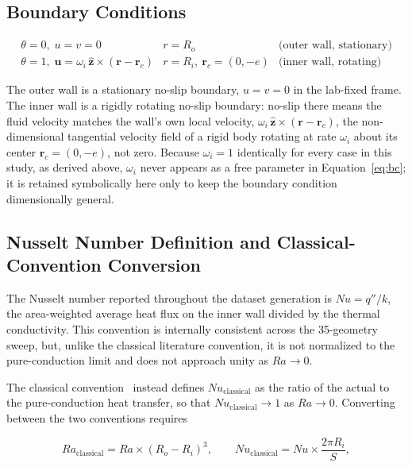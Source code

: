\subsection{Boundary Conditions}
\label{subsec:bc}

\begin{equation}
\begin{array}{lll}
  \theta = 0,\; u=v=0 & r = R_o & \text{(outer wall, stationary)} \\[4pt]
  \theta = 1,\; \mathbf{u} = \omega_i\,\hat{\mathbf{z}}\times(\mathbf{r}-\mathbf{r}_c) & r = R_i,\ \mathbf{r}_c=(0,-e) & \text{(inner wall, rotating)}
\end{array}
\label{eq:bc}
\end{equation}

The outer wall is a stationary no-slip boundary, $u=v=0$ in the lab-fixed frame. The inner wall is a rigidly rotating no-slip boundary: no-slip there means the fluid velocity matches the wall's own local velocity, $\omega_i\,\hat{\mathbf{z}}\times(\mathbf{r}-\mathbf{r}_c)$, the non-dimensional tangential velocity field of a rigid body rotating at rate $\omega_i$ about its center $\mathbf{r}_c=(0,-e)$, not zero. Because $\omega_i=1$ identically for every case in this study, as derived above, $\omega_i$ never appears as a free parameter in Equation~\eqref{eq:bc}; it is retained symbolically here only to keep the boundary condition dimensionally general.

\subsection{Nusselt Number Definition and Classical-Convention Conversion}
\label{subsec:nu_convention}

The Nusselt number reported throughout the dataset generation is $Nu = q''/k$, the area-weighted average heat flux on the inner wall divided by the thermal conductivity. This convention is internally consistent across the 35-geometry sweep, but, unlike the classical literature convention, it is not normalized to the pure-conduction limit and does not approach unity as $Ra \to 0$.

The classical convention~\cite{KuehnGoldstein1978,Lee1992a,Lee1992b,Yoo1998,Pranowo2024} instead defines $Nu_{\text{classical}}$ as the ratio of the actual to the pure-conduction heat transfer, so that $Nu_{\text{classical}} \to 1$ as $Ra \to 0$. Converting between the two conventions requires

\begin{equation}
  Ra_{\text{classical}} = Ra \times (R_o - R_i)^3, \qquad
  Nu_{\text{classical}} = Nu \times \frac{2\pi R_i}{S},
  \label{eq:conversion}
\end{equation}

